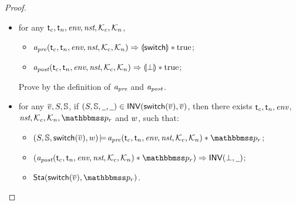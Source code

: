 \begin{proof}
\begin{itemize}
        \item for any $\textsf{t}_c, \textsf{t}_n, \textit{env}, \textit{nst}, \mathcal{K}_c, \mathcal{K}_n$,
            \begin{itemize}
                \small
                \item $\textit{a}_\textit{pre}(\textsf{t}_c, \textsf{t}_n, \textit{env}, \textit{nst}, \mathcal{K}_c, \mathcal{K}_n)
                    \Rightarrow \llparenthesis {\mathsf{switch}} \rrparenthesis * \text{true}$;
                \item $\textit{a}_\textit{post}(\textsf{t}_c, \textsf{t}_n, \textit{env}, \textit{nst}, \mathcal{K}_c, \mathcal{K}_n)
                    \Rightarrow \llparenthesis {\perp} \rrparenthesis * \text{true}$;
            \end{itemize}
        \vspace*{0.3em}
        Prove by the definition of $\textit{a}_\textit{pre}$ and $\textit{a}_\textit{post}$.

        \item for any $\overline{v}, S, \mathbb{S}$,
        if $(S, \mathbb{S}, \underline{\ \,}, \underline{\ \,}) \in
            \textsf{INV}{(\mathsf{switch}(\overline{v}), \overline{v})}$,
        then there exists $\textsf{t}_c, \textsf{t}_n, \textit{env}$, $\nst,
        \hthrdlocalst_c, \hthrdlocalst_n, \relastP_r$ and $w$,
        such that:
        \begin{itemize}
            \small
            \item $\asrtmodel{(\state, \hpstate, \primsw(\args{\val}), \word)}
                {\Apre(\thrdid_c, \thrdid_n, \env, \nst, \hthrdlocalst_c,
                \hthrdlocalst_n) \sepstar \relastP_r}$;
            \item  $(\Apost(\thrdid_c, \thrdid_n, \env, \nst, \hthrdlocalst_c,
                \hthrdlocalst_n) \sepstar \relastP_r) \Rightarrow
                \INV{(\primdone, \notCare)}$;
            \item $\Sta(\primsw(\args{\val}), \relastP_r)$.
        \end{itemize}


\end{itemize}
\end{proof}
